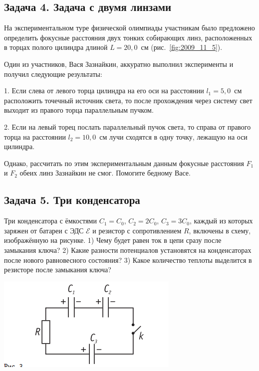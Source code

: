 \subsection*{Задача 4. Задача с двумя линзами}

На экспериментальном туре физической олимпиады участникам было
предложено определить фокусные расстояния двух тонких собирающих линз,
расположенных в торцах полого цилиндра длиной $L=20{,}0$~см
(рис.~\ref{fig:2009_11_5}).

Один из участников, Вася Зазнайкин, аккуратно выполнил эксперименты и
получил следующие результаты:

1. Если слева от левого торца цилиндра на его оси на расстоянии
$l_1=5{,}0$~см расположить точечный источник света, то после
прохождения через систему свет выходит из правого торца параллельным
пучком.

2. Если на левый торец послать параллельный пучок света, то справа от
правого торца на расстоянии $l_2=10{,}0$~см лучи сходятся в одну
точку, лежащую на оси цилиндра.

Однако, рассчитать по этим экспериментальным данным фокусные
расстояния $F_1$ и $F_2$ обеих линз Зазнайкин не смог. Помогите
бедному Васе.

\subsection*{Задача 5. Три конденсатора}

Три конденсатора с ёмкостями $C_1 = C_0$, $C_2 = 2C_0$, $C_3 = 3 C_0$,
каждый из которых заряжен от батареи с ЭДС $\mathcal{E}$ и резистор с
сопротивлением $R$, включены в схему, изображённую на рисунке. 1) Чему
будет равен ток в цепи сразу после замыкания ключа?  2) Какие разности
потенциалов установятся на конденсаторах после нового равновесного
состояния? 3) Какое количество теплоты выделится в резисторе после
замыкания ключа?

\begin{center}
\includegraphics[scale=0.7]{115.png}  
\end{center}

  






